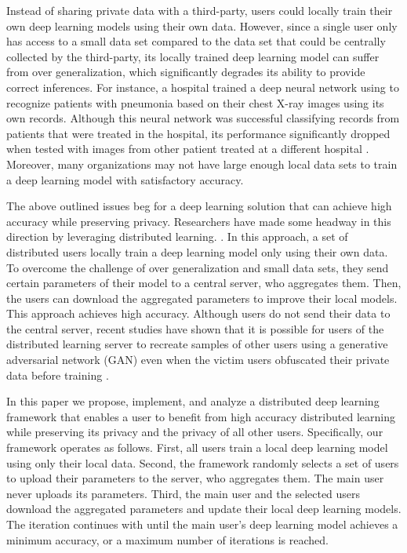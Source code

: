 \documentclass[conference]{IEEEtran}
\begin{document}
Instead of sharing private data with a third-party, users could locally train their own deep learning models using their own
data. However, since a single user only has access to a small data set compared to the data set that could be centrally
collected by the third-party, its locally trained deep learning model can suffer from over generalization, which significantly
degrades its ability to provide correct inferences. 
For instance, a hospital trained a deep neural network using to recognize patients with pneumonia based on their
chest X-ray images using its own records. Although this neural network was successful classifying records from patients that were
treated in the hospital, its performance significantly dropped when tested with images from other patient treated at a different
hospital \cite{zech2018variable}. 
Moreover, many organizations may not have large enough local data sets to train a deep learning model with satisfactory
accuracy. 
 
The above outlined issues beg for a deep learning solution that can achieve high accuracy while preserving privacy. 
Researchers have made some headway in this direction by leveraging distributed learning. 
\cite{shokri2015privacy}.
In this approach, a set of distributed users locally
train a deep learning model only using their own data. To overcome the challenge of over generalization and small
data sets, they send certain parameters of their model to a central server, who aggregates them. 
Then, the users can download the aggregated parameters to improve their local models. This approach achieves high accuracy.
Although   users do not send their data to the central server, recent studies have shown that it is possible for users of the
distributed learning server to recreate samples of other users using a generative adversarial network (GAN) even when the victim users 
obfuscated their private data before training \cite{hitaj2017deep}.

In this paper we propose, implement, and analyze a distributed deep learning framework that enables a user to benefit from 
high accuracy distributed learning while preserving its privacy and the privacy of all other users. 
Specifically, our framework operates as follows. First, all users train a local deep learning model using only their local data.
Second, the framework randomly selects a set of users to upload their parameters to the server, who aggregates them. The main user
never uploads its parameters. Third, the main user and the selected users download the aggregated parameters and update their local
deep learning models. The iteration continues with until the main user's deep learning model achieves a minimum
accuracy, or a maximum number of iterations is reached.
\end{document}
